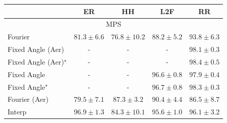 \begin{tabular}{l|cccc|}
\toprule
            & ER & HH & L2F & RR \\
\midrule
\multicolumn{5}{c}{\rule{0pt}{8pt}MPS} \\
\midrule
Fourier & {\cellcolor[HTML]{FEEAA0}} \color[HTML]{000000} $81.3\pm 6.6$ & {\cellcolor[HTML]{FFFFE5}} \color[HTML]{000000} $76.8\pm 10.2$ & {\cellcolor[HTML]{FA8F24}} \color[HTML]{F1F1F1} $88.2\pm 5.2$ & {\cellcolor[HTML]{BC4503}} \color[HTML]{F1F1F1} $93.8\pm 6.3$ \\
Fixed Angle (Aer) & {\cellcolor[HTML]{000000}} \color[HTML]{F1F1F1} {\cellcolor{white}} \color{black} - & {\cellcolor[HTML]{000000}} \color[HTML]{F1F1F1} {\cellcolor{white}} \color{black} - & {\cellcolor[HTML]{000000}} \color[HTML]{F1F1F1} {\cellcolor{white}} \color{black} - & {\cellcolor[HTML]{6B2606}} \color[HTML]{F1F1F1} $98.1\pm 0.3$ \\
Fixed Angle (Aer)$^\star$ & {\cellcolor[HTML]{000000}} \color[HTML]{F1F1F1} {\cellcolor{white}} \color{black} - & {\cellcolor[HTML]{000000}} \color[HTML]{F1F1F1} {\cellcolor{white}} \color{black} - & {\cellcolor[HTML]{000000}} \color[HTML]{F1F1F1} {\cellcolor{white}} \color{black} - & {\cellcolor[HTML]{662506}} \color[HTML]{F1F1F1} $98.4\pm 0.5$ \\
Fixed Angle & {\cellcolor[HTML]{000000}} \color[HTML]{F1F1F1} {\cellcolor{white}} \color{black} - & {\cellcolor[HTML]{000000}} \color[HTML]{F1F1F1} {\cellcolor{white}} \color{black} - & {\cellcolor[HTML]{882F05}} \color[HTML]{F1F1F1} $96.6\pm 0.8$ & {\cellcolor[HTML]{6E2706}} \color[HTML]{F1F1F1} $97.9\pm 0.4$ \\
Fixed Angle$^\star$ & {\cellcolor[HTML]{000000}} \color[HTML]{F1F1F1} {\cellcolor{white}} \color{black} - & {\cellcolor[HTML]{000000}} \color[HTML]{F1F1F1} {\cellcolor{white}} \color{black} - & {\cellcolor[HTML]{862E05}} \color[HTML]{F1F1F1} $96.7\pm 0.8$ & {\cellcolor[HTML]{682506}} \color[HTML]{F1F1F1} $98.3\pm 0.3$ \\
Fourier (Aer) & {\cellcolor[HTML]{FFF7BC}} \color[HTML]{000000} $79.5\pm 7.1$ & {\cellcolor[HTML]{FE9E2D}} \color[HTML]{000000} $87.3\pm 3.2$ & {\cellcolor[HTML]{EA6E13}} \color[HTML]{F1F1F1} $90.4\pm 4.4$ & {\cellcolor[HTML]{FEAB39}} \color[HTML]{000000} $86.5\pm 8.7$ \\
Interp & {\cellcolor[HTML]{812D05}} \color[HTML]{F1F1F1} $96.9\pm 1.3$ & {\cellcolor[HTML]{FECB5F}} \color[HTML]{000000} $84.3\pm 10.1$ & {\cellcolor[HTML]{9B3504}} \color[HTML]{F1F1F1} $95.6\pm 1.0$ & {\cellcolor[HTML]{913204}} \color[HTML]{F1F1F1} $96.1\pm 3.2$ \\

\end{tabular}
